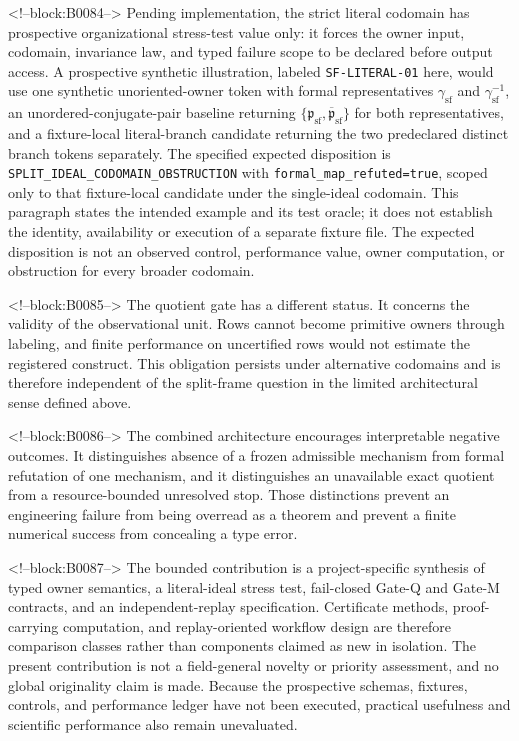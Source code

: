 \documentclass[11pt,a4paper]{article}
\begin{document}
<!--block:B0084-->
Pending implementation, the strict literal codomain has prospective organizational stress-test value only: it forces the owner input, codomain, invariance law, and typed failure scope to be declared before output access. A prospective synthetic illustration, labeled \texttt{SF-LITERAL-01} here, would use one synthetic unoriented-owner token with formal representatives \(\gamma_{\mathrm{sf}}\) and \(\gamma_{\mathrm{sf}}^{-1}\), an unordered-conjugate-pair baseline returning \(\{\mathfrak p_{\mathrm{sf}},\overline{\mathfrak p}_{\mathrm{sf}}\}\) for both representatives, and a fixture-local literal-branch candidate returning the two predeclared distinct branch tokens separately. The specified expected disposition is \texttt{SPLIT\_IDEAL\_CODOMAIN\_OBSTRUCTION} with \texttt{formal\_map\_refuted=true}, scoped only to that fixture-local candidate under the single-ideal codomain. This paragraph states the intended example and its test oracle; it does not establish the identity, availability or execution of a separate fixture file. The expected disposition is not an observed control, performance value, owner computation, or obstruction for every broader codomain.

<!--block:B0085-->
The quotient gate has a different status. It concerns the validity of the observational unit. Rows cannot become primitive owners through labeling, and finite performance on uncertified rows would not estimate the registered construct. This obligation persists under alternative codomains and is therefore independent of the split-frame question in the limited architectural sense defined above.

<!--block:B0086-->
The combined architecture encourages interpretable negative outcomes. It distinguishes absence of a frozen admissible mechanism from formal refutation of one mechanism, and it distinguishes an unavailable exact quotient from a resource-bounded unresolved stop. Those distinctions prevent an engineering failure from being overread as a theorem and prevent a finite numerical success from concealing a type error.

<!--block:B0087-->
The bounded contribution is a project-specific synthesis of typed owner semantics, a literal-ideal stress test, fail-closed Gate-Q and Gate-M contracts, and an independent-replay specification. Certificate methods, proof-carrying computation, and replay-oriented workflow design are therefore comparison classes rather than components claimed as new in isolation. The present contribution is not a field-general novelty or priority assessment, and no global originality claim is made. Because the prospective schemas, fixtures, controls, and performance ledger have not been executed, practical usefulness and scientific performance also remain unevaluated.
\end{document}
